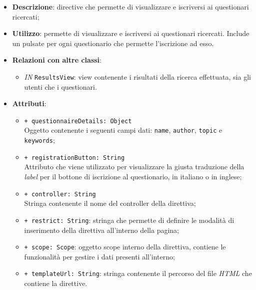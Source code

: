 \begin{itemize}
	\item \textbf{Descrizione}: directive che permette di visualizzare e iscriversi ai questionari ricercati;
	\item \textbf{Utilizzo}: permette di visualizzare e iscriversi ai questionari ricercati. Include un pulsate per ogni questionario che permette l'iscrizione ad esso.
	\item \textbf{Relazioni con altre classi}:
	\begin{itemize}
		\item \textit{IN} \texttt{ResultsView}: view contenente i risultati della ricerca effettuata, sia gli utenti che i questionari.
	\end{itemize}
	\item \textbf{Attributi}:
	\begin{itemize}
		\item \texttt{+ questionnaireDetails: Object} \\ Oggetto contenente i seguenti campi dati: \texttt{name}, \texttt{author}, \texttt{topic} e \texttt{keywords};
		\item \texttt{+ registrationButton: String} \\ Attributo che viene utilizzato per visualizzare la giusta traduzione della \textit{label} per il bottone di iscrizione al questionario, in italiano o in inglese;
		\item \texttt{+ controller: String} \\ Stringa contenente il nome del controller della direttiva;
		\item \texttt{+ restrict: String}: stringa che permette di definire le modalità di inserimento della direttiva all'interno della pagina;
		\item \texttt{+ scope: Scope}: oggetto scope interno della direttiva, contiene le funzionalità per gestire i dati presenti all'interno;
		\item \texttt{+ templateUrl: String}: stringa contenente il percorso del file \textit{HTML} che contiene la direttive.
	\end{itemize}
\end{itemize}